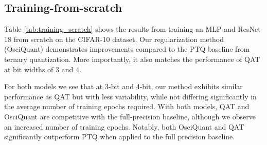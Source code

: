 \subsection{Training-from-scratch}
Table \ref{tab:training_scratch} shows the results from training an MLP and ResNet-18 from scratch on the CIFAR-10 dataset. Our regularization method (OsciQuant) demonstrates improvements compared to the PTQ baseline from ternary quantization. More importantly, it also matches the performance of QAT at bit widths of 3 and 4. 

For both models we see that at 3-bit and 4-bit, our method exhibits similar performance as QAT but with less variability, while not differing significantly in the average number of training epochs required. With both models, QAT and OsciQuant are competitive with the full-precision baseline, although we observe an increased number of training epochs. Notably, both OsciQuant and QAT significantly outperform PTQ when applied to the full precision baseline.

